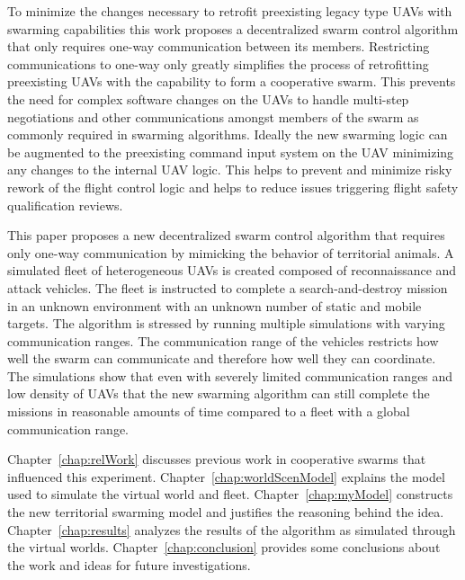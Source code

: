 To minimize the changes necessary to retrofit preexisting legacy type UAVs with swarming capabilities this work proposes a decentralized swarm control algorithm that only requires one-way communication between its members.  Restricting communications to one-way only greatly simplifies the process of retrofitting preexisting UAVs with the capability to form a cooperative swarm. This prevents the need for complex software changes on the UAVs to handle multi-step negotiations and other communications amongst members of the swarm as commonly required in swarming algorithms.  Ideally the new swarming logic can be augmented to the preexisting command input system on the UAV minimizing any changes to the internal UAV logic.  This helps to prevent and minimize risky rework of the flight control logic and helps to reduce issues triggering flight safety qualification reviews.

This paper proposes a new decentralized swarm control algorithm that requires only one-way communication by mimicking the behavior of territorial animals.  A simulated fleet of heterogeneous UAVs is created composed of reconnaissance and attack vehicles.  The fleet is instructed to complete a search-and-destroy mission in an unknown environment with an unknown number of static and mobile targets.  The algorithm is stressed by running multiple simulations with varying communication ranges.  The communication range of the vehicles restricts how well the swarm can communicate and therefore how well they can coordinate.  The simulations show that even with severely limited communication ranges and low density of UAVs that the new swarming algorithm can still complete the missions in reasonable amounts of time compared to a fleet with a global communication range.

Chapter~\ref{chap:relWork} discusses previous work in cooperative swarms that influenced this experiment.  Chapter~\ref{chap:worldScenModel} explains the model used to simulate the virtual world and fleet.  Chapter~\ref{chap:myModel} constructs the new territorial swarming model and justifies the reasoning behind the idea.  Chapter~\ref{chap:results} analyzes the results of the algorithm as simulated through the virtual worlds.  Chapter~\ref{chap:conclusion} provides some conclusions about the work and ideas for future investigations.

